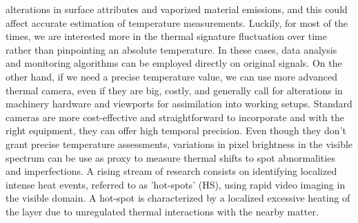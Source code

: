 alterations in surface attributes and vaporized material emissions, and this could affect accurate estimation of temperature measurements. Luckily, for most of the times, we are interested more in the thermal signature fluctuation over time rather than pinpointing an absolute temperature. In these cases, data analysis and monitoring algorithms can be employed directly on original signals. On the other hand, if we need a precise temperature value, we can use more advanced thermal camera, even if they are big, costly, and generally call for alterations in machinery hardware and viewports for assimilation into working setups. Standard cameras are more cost-effective and straightforward to incorporate and with the right equipment, they can offer high temporal precision. Even though they don't grant precise temperature assessments, variations in pixel brightness in the visible spectrum can be use as proxy to measure thermal shifts to spot abnormalities and imperfections. A rising stream of research consists on identifying localized intense heat events, referred to as 'hot-spots' (HS), using rapid video imaging in the visible domain. A hot-spot is characterized by a localized excessive heating of the layer due to unregulated thermal interactions with the nearby matter.
